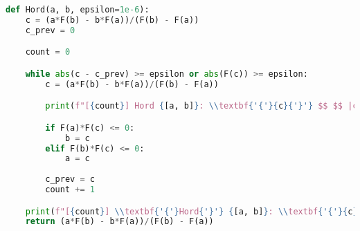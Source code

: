 \documentclass{article}
\begin{document}
    \begin{lstlisting}[language=Python, caption=Hord]
def Hord(a, b, epsilon=1e-6):
    c = (a*F(b) - b*F(a))/(F(b) - F(a))
    c_prev = 0

    count = 0

    while abs(c - c_prev) >= epsilon or abs(F(c)) >= epsilon:
        c = (a*F(b) - b*F(a))/(F(b) - F(a))

        print(f"[{count}] Hord {[a, b]}: \\textbf{'{'}{c}{'}'} $$ $$ |c - c_prev| = |{c} - {c_prev}| = {abs(c - c_prev)} >= {epsilon} $$ $$ |f(c)| = |f({c}| = {abs(F(c))} >= {epsilon})")

        if F(a)*F(c) <= 0:
            b = c
        elif F(b)*F(c) <= 0:
            a = c
        
        c_prev = c
        count += 1

    print(f"[{count}] \\textbf{'{'}Hord{'}'} {[a, b]}: \\textbf{'{'}{c}{'}'} $$ $$ |c - c_prev| = |{c} - {c_prev}| = {abs(c - c_prev)} < {epsilon} $$ $$ OR |f(c)| = |f({c}| = {abs(F(c))} < {epsilon})")
    return (a*F(b) - b*F(a))/(F(b) - F(a))
    \end{lstlisting}
\end{document}
